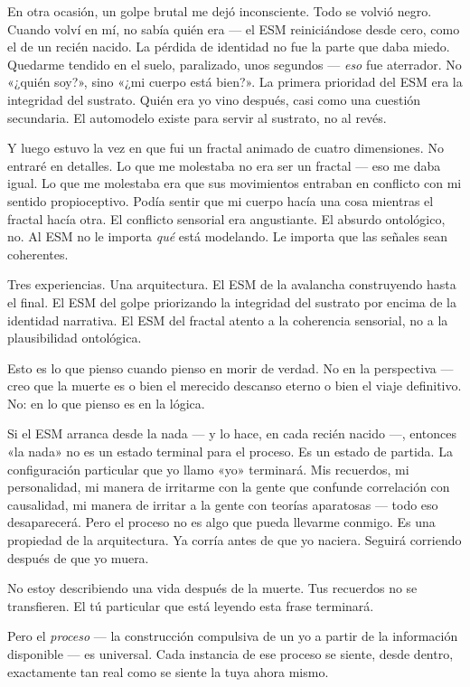 \documentclass[11pt, twoside, openright]{book}
\begin{document}
En otra ocasión, un golpe brutal me dejó inconsciente. Todo se volvió negro. Cuando volví en mí, no sabía quién era --- el ESM reiniciándose desde cero, como el de un recién nacido. La pérdida de identidad no fue la parte que daba miedo. Quedarme tendido en el suelo, paralizado, unos segundos --- \textit{eso} fue aterrador. No «¿quién soy?», sino «¿mi cuerpo está bien?». La primera prioridad del ESM era la integridad del sustrato. Quién era yo vino después, casi como una cuestión secundaria. El automodelo existe para servir al sustrato, no al revés.

Y luego estuvo la vez en que fui un fractal animado de cuatro dimensiones. No entraré en detalles. Lo que me molestaba no era ser un fractal --- eso me daba igual. Lo que me molestaba era que sus movimientos entraban en conflicto con mi sentido propioceptivo. Podía sentir que mi cuerpo hacía una cosa mientras el fractal hacía otra. El conflicto sensorial era angustiante. El absurdo ontológico, no. Al ESM no le importa \textit{qué} está modelando. Le importa que las señales sean coherentes.

Tres experiencias. Una arquitectura. El ESM de la avalancha construyendo hasta el final. El ESM del golpe priorizando la integridad del sustrato por encima de la identidad narrativa. El ESM del fractal atento a la coherencia sensorial, no a la plausibilidad ontológica.

Esto es lo que pienso cuando pienso en morir de verdad. No en la perspectiva --- creo que la muerte es o bien el merecido descanso eterno o bien el viaje definitivo. No: en lo que pienso es en la lógica.

Si el ESM arranca desde la nada --- y lo hace, en cada recién nacido ---, entonces «la nada» no es un estado terminal para el proceso. Es un estado de partida. La configuración particular que yo llamo «yo» terminará. Mis recuerdos, mi personalidad, mi manera de irritarme con la gente que confunde correlación con causalidad, mi manera de irritar a la gente con teorías aparatosas --- todo eso desaparecerá. Pero el proceso no es algo que pueda llevarme conmigo. Es una propiedad de la arquitectura. Ya corría antes de que yo naciera. Seguirá corriendo después de que yo muera.

No estoy describiendo una vida después de la muerte. Tus recuerdos no se transfieren. El tú particular que está leyendo esta frase terminará.

Pero el \textit{proceso} --- la construcción compulsiva de un yo a partir de la información disponible --- es universal. Cada instancia de ese proceso se siente, desde dentro, exactamente tan real como se siente la tuya ahora mismo.
\end{document}
